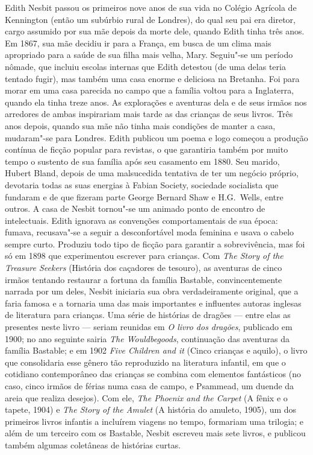 Edith Nesbit passou os primeiros nove anos de sua vida no Colégio
Agrícola de Kennington (então um subúrbio rural de Londres), do
qual seu pai era diretor, cargo assumido por sua mãe depois da
morte dele, quando Edith tinha três anos. Em 1867, sua mãe decidiu ir
para a França, em busca de um clima mais apropriado para a saúde de sua filha
mais velha, Mary. Seguiu"-se um período nômade, que incluiu escolas
internas que Edith detestou (de uma delas teria tentado fugir), mas
também uma casa enorme e deliciosa na Bretanha. Foi para morar em uma casa
parecida no campo que a família voltou para a Inglaterra, quando ela
tinha treze anos. As explorações e aventuras dela e de seus irmãos
nos arredores de ambas inspirariam mais tarde as das crianças de seus
livros. Três anos depois, quando sua mãe não tinha mais condições de manter
a casa, mudaram"-se para Londres. Edith publicou um poema e logo
começou a produção contínua de ficção popular para revistas, o que
garantiria também por muito tempo o sustento de sua família após seu
casamento em 1880. Seu marido, Hubert Bland, depois de uma
malsucedida tentativa de ter um negócio próprio, devotaria todas
as suas energias à Fabian Society, sociedade socialista que fundaram 
e de que fizeram parte George Bernard
Shaw e H.G.~Wells, entre outros. A casa de Nesbit tornou"-se um
animado ponto de encontro de intelectuais. Edith ignorava as convenções 
comportamentais de sua época: fumava, recusava"-se a seguir a desconfortável moda feminina e
usava o cabelo sempre curto. Produziu todo
tipo de ficção para garantir a sobrevivência, mas foi só em 1898 que
experimentou escrever para crianças. Com \textit{The Story of the Treasure
Seekers} (História dos caçadores de tesouro), 
as aventuras de cinco irmãos tentando restaurar a fortuna da
família Bastable, convincentemente narrada por um deles, Nesbit
iniciaria sua obra verdadeiramente original, que a faria famosa e a
tornaria uma das mais importantes e influentes autoras inglesas de
literatura para crianças. Uma série de histórias de dragões — entre
elas as presentes neste livro —  seriam reunidas em \textit{O livro dos dragões},
publicado em 1900; no ano seguinte sairia \textit{The Wouldbegoods},
continuação das aventuras da família Bastable; e em 1902 \textit{Five
Children and it} (Cinco crianças e aquilo), o livro que consolidaria esse gênero tão
reproduzido na literatura infantil, em que o cotidiano contemporâneo das
crianças se combina com elementos fantásticos (no caso, cinco irmãos
de férias numa casa de campo, e Psammead, um duende da areia que
realiza desejos). Com ele, \textit{The Phoenix and the Carpet} (A fênix e o tapete, 1904) e \textit{The
Story of the Amulet} (A história do amuleto, 1905), um dos primeiros livros infantis a
incluírem viagens no tempo, formariam uma trilogia; e além de um
terceiro com os Bastable, Nesbit escreveu mais sete livros, e
publicou também algumas coletâneas de histórias curtas. 


